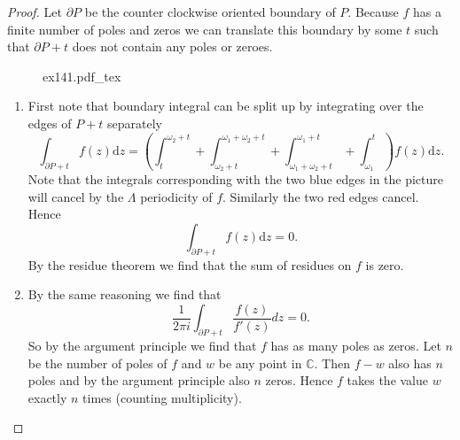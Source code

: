 \documentclass[titlepage,a4paper]{article}
\newcommand{\incfig}[1]{%
	\def\svgwidth{\columnwidth}
	{#1.pdf_tex}
}
\theoremstyle{theoremdd}
\theoremstyle{definitiondd}
\theoremstyle{remarkdd}
\newcommand{\C}{\mathbb{C}}
\begin{document}
\begin{proof}
	Let $\partial P$ be the counter clockwise oriented boundary of $P$. Because $f$ has a finite number of poles and zeros we can translate this boundary by some $t$ such that $\partial P + t$ does not contain any poles or zeroes.
\begin{figure}[h]
	\incfig{ex141}	
\end{figure}
\begin{enumerate}
	\item First note that boundary integral can be split up by integrating over the edges of $P + t$ separately\[
			\int_{\partial P+ t} f(z) \mathrm d z = \left(\int_t^{\omega_2 + t} + \int_{\omega_2+t}^{\omega_1 + \omega_2 + t} + \int_{\omega_1 + \omega_2 + t} ^{\omega_1 + t} + \int_{\omega_1}^{t}\right) f(z) \mathrm dz
	.\] 
	Note that the integrals corresponding with the two blue edges in the picture will cancel by the $\Lambda$ periodicity of $f$. Similarly the two red edges cancel. 
	Hence \[
		\int_{\partial P + t} f(z) \mathrm d z = 0
	.\] 
	By the residue theorem we find that the sum of residues on $f$ is zero.
	
\item By the same reasoning we find that \[
		\frac{1}{2\pi i}\int_{\partial P + t} \frac{f(z)}{f'(z)}dz = 0
.\] 
So by the argument principle we find that $f$ has as many poles as zeros. Let $n$ be the number of poles of $f$ and $w$ be any point in $\C$. 
Then $f - w$ also has $n$ poles and by the argument principle also $n$ zeros. 
Hence $f$ takes the value $w$ exactly $n$ times (counting multiplicity).


\end{enumerate}
\end{proof}
\end{document}
